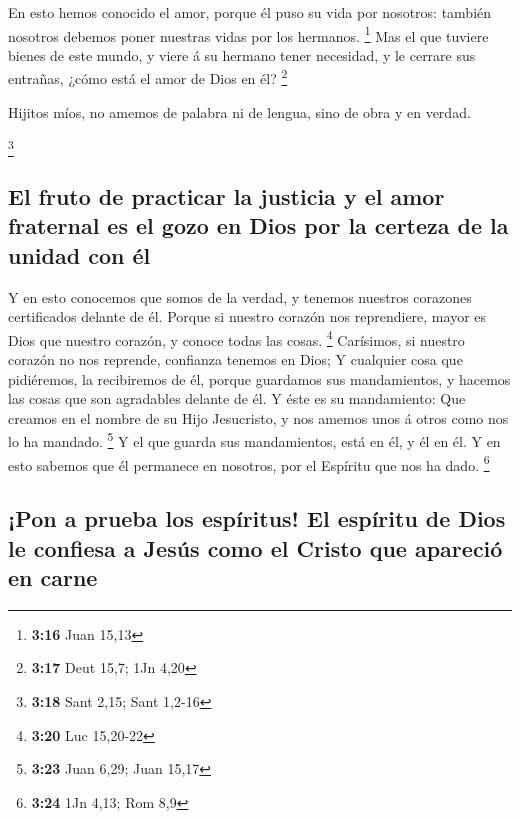  En esto hemos conocido el amor, porque él puso su vida por
nosotros: también nosotros debemos poner nuestras vidas por los
hermanos. \footnote{\textbf{3:16} Juan 15,13}  Mas el que
tuviere bienes de este mundo, y viere á su hermano tener necesidad, y le
cerrare sus entrañas, ¿cómo está el amor de Dios en él? \footnote{\textbf{3:17}
  Deut 15,7; 1Jn 4,20}

 Hijitos míos, no amemos de palabra ni de lengua, sino de
obra y en verdad.

\footnote{\textbf{3:18} Sant 2,15; Sant 1,2-16}

\hypertarget{el-fruto-de-practicar-la-justicia-y-el-amor-fraternal-es-el-gozo-en-dios-por-la-certeza-de-la-unidad-con-uxe9l}{%
\subsection{El fruto de practicar la justicia y el amor fraternal es el
gozo en Dios por la certeza de la unidad con
él}\label{el-fruto-de-practicar-la-justicia-y-el-amor-fraternal-es-el-gozo-en-dios-por-la-certeza-de-la-unidad-con-uxe9l}}

 Y en esto conocemos que somos de la verdad, y tenemos
nuestros corazones certificados delante de él.  Porque si
nuestro corazón nos reprendiere, mayor es Dios que nuestro corazón, y
conoce todas las cosas. \footnote{\textbf{3:20} Luc 15,20-22}
 Carísimos, si nuestro corazón no nos reprende, confianza
tenemos en Dios;  Y cualquier cosa que pidiéremos, la
recibiremos de él, porque guardamos sus mandamientos, y hacemos las
cosas que son agradables delante de él.  Y éste es su
mandamiento: Que creamos en el nombre de su Hijo Jesucristo, y nos
amemos unos á otros como nos lo ha mandado. \footnote{\textbf{3:23} Juan
  6,29; Juan 15,17}  Y el que guarda sus mandamientos, está
en él, y él en él. Y en esto sabemos que él permanece en nosotros, por
el Espíritu que nos ha dado. \footnote{\textbf{3:24} 1Jn 4,13; Rom 8,9}

\hypertarget{pon-a-prueba-los-espuxedritus-el-espuxedritu-de-dios-le-confiesa-a-jesuxfas-como-el-cristo-que-apareciuxf3-en-carne}{%
\subsection{¡Pon a prueba los espíritus! El espíritu de Dios le confiesa
a Jesús como el Cristo que apareció en
carne}\label{pon-a-prueba-los-espuxedritus-el-espuxedritu-de-dios-le-confiesa-a-jesuxfas-como-el-cristo-que-apareciuxf3-en-carne}}

